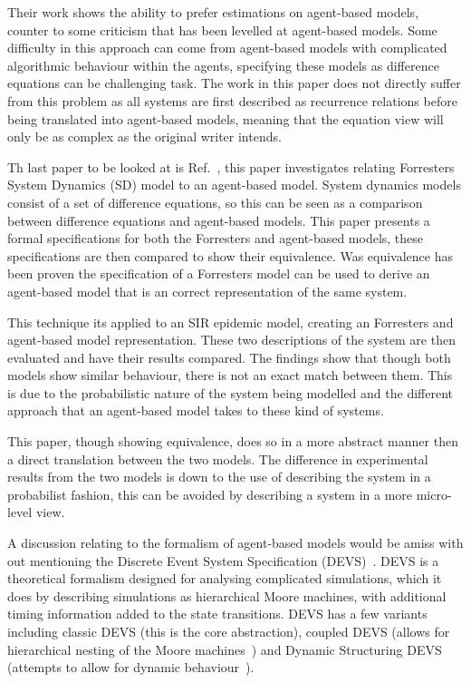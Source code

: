 \documentclass{article}
\begin{document}
Their work shows the ability to prefer estimations on agent-based models, counter to some criticism that has been levelled at agent-based models. Some difficulty in this approach can come from agent-based models with complicated algorithmic behaviour within the agents, specifying these models as difference equations can be challenging task. The work in this paper does not directly suffer from this problem as all systems are first described as recurrence relations before being translated into agent-based models, meaning that the equation view will only be as complex as the original writer intends.  

Th last paper to be looked at is Ref.~\cite{abmtsd}, this paper investigates relating Forrester\textsc{}s System Dynamics (SD) model to an agent-based model. System dynamics models consist of a set of difference equations, so this can be seen as a comparison between difference equations and agent-based models. This paper presents a formal specifications for both the Forrester\textsc{}s and agent-based models, these specifications are then compared to show their equivalence. Was equivalence has been proven the specification of a Forrester\textsc{}s model can be used to derive an agent-based model that is an correct representation of the same system.

This technique its applied to an SIR epidemic model, creating an Forrester\textsc{}s and agent-based model representation. These two descriptions of the system are then evaluated and have their results compared. The findings show that though both models show similar behaviour, there is not an exact match between them. This is due to the probabilistic nature of the system being modelled and the different approach that an agent-based model takes to these kind of systems. 

This paper, though showing equivalence, does so in a more abstract manner then a direct translation between the two models. The difference in experimental results from the two models is down to the use of describing the system in a probabilist fashion, this can be avoided by describing a system in a more micro-level view.    

A discussion relating to the formalism of agent-based models would be amiss with out mentioning the Discrete Event System Specification (DEVS)~\cite{introdevs}. DEVS is a theoretical formalism designed for analysing complicated simulations, which it does by describing simulations as hierarchical Moore machines, with additional timing information added to the state transitions. DEVS has a few variants including classic DEVS (this is the core abstraction), coupled DEVS (allows for hierarchical nesting of the Moore machines~\cite{coupleddevs}) and Dynamic Structuring DEVS (attempts to allow for dynamic behaviour~\cite{dynamicdevs}).
\end{document}
